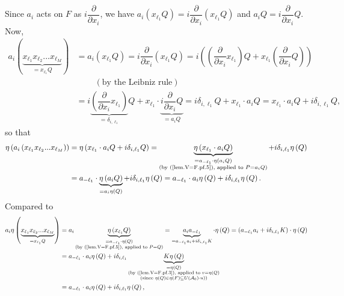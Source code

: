 \documentclass
[numbers=enddot,12pt,final,onecolumn,german,notitlepage]{scrartcl}%
\theoremstyle{definition}
\begin{document}
Since $a_{i}$ acts on $F$ as $i\dfrac{\partial}{\partial x_{i}}$, we have
$a_{i}\left(  x_{\ell_{1}}Q\right)  =i\dfrac{\partial}{\partial x_{i}}\left(
x_{\ell_{1}}Q\right)  $ and $a_{i}Q=i\dfrac{\partial}{\partial x_{i}}Q$. Now,%
\begin{align*}
a_{i}\left(  \underbrace{x_{\ell_{1}}x_{\ell_{2}}...x_{\ell_{M}}}%
_{=x_{\ell_{1}}Q}\right)   &  =a_{i}\left(  x_{\ell_{1}}Q\right)
=i\dfrac{\partial}{\partial x_{i}}\left(  x_{\ell_{1}}Q\right)  =i\left(
\left(  \dfrac{\partial}{\partial x_{i}}x_{\ell_{1}}\right)  Q+x_{\ell_{1}%
}\left(  \dfrac{\partial}{\partial x_{i}}Q\right)  \right) \\
&  \ \ \ \ \ \ \ \ \ \ \left(  \text{by the Leibniz rule}\right) \\
&  =i\underbrace{\left(  \dfrac{\partial}{\partial x_{i}}x_{\ell_{1}}\right)
}_{=\delta_{i,\ell_{1}}}Q+x_{\ell_{1}}\cdot\underbrace{i\dfrac{\partial
}{\partial x_{i}}Q}_{=a_{i}Q}=i\delta_{i,\ell_{1}}Q+x_{\ell_{1}}\cdot
a_{i}Q=x_{\ell_{1}}\cdot a_{i}Q+i\delta_{i,\ell_{1}}Q,
\end{align*}
so that%
\begin{align*}
\eta\left(  a_{i}\left(  x_{\ell_{1}}x_{\ell_{2}}...x_{\ell_{M}}\right)
\right)   &  =\eta\left(  x_{\ell_{1}}\cdot a_{i}Q+i\delta_{i,\ell_{1}%
}Q\right)  =\underbrace{\eta\left(  x_{\ell_{1}}\cdot a_{i}Q\right)
}_{\substack{=a_{-\ell_{1}}\cdot\eta\left(  a_{i}Q\right)  \\\text{(by
(\ref{lem.V=F.pf.5}), applied to }P=a_{i}Q\text{)}}}+i\delta_{i,\ell_{1}}%
\eta\left(  Q\right) \\
&  =a_{-\ell_{1}}\cdot\underbrace{\eta\left(  a_{i}Q\right)  }_{=a_{i}%
\eta\left(  Q\right)  }+i\delta_{i,\ell_{1}}\eta\left(  Q\right)
=a_{-\ell_{1}}\cdot a_{i}\eta\left(  Q\right)  +i\delta_{i,\ell_{1}}%
\eta\left(  Q\right)  .
\end{align*}
Compared to%
\begin{align*}
a_{i}\eta\left(  \underbrace{x_{\ell_{1}}x_{\ell_{2}}...x_{\ell_{M}}%
}_{=x_{\ell_{1}}Q}\right)   &  =a_{i}\underbrace{\eta\left(  x_{\ell_{1}%
}Q\right)  }_{\substack{=a_{-\ell_{1}}\cdot\eta\left(  Q\right)  \\\text{(by
(\ref{lem.V=F.pf.5}), applied to }P=Q\text{)}}}=\underbrace{a_{i}a_{-\ell_{1}%
}}_{=a_{-\ell_{1}}a_{i}+i\delta_{i,\ell_{1}}K}\cdot\eta\left(  Q\right)
=\left(  a_{-\ell_{1}}a_{i}+i\delta_{i,\ell_{1}}K\right)  \cdot\eta\left(
Q\right) \\
&  =a_{-\ell_{1}}\cdot a_{i}\eta\left(  Q\right)  +i\delta_{i,\ell_{1}%
}\underbrace{K\eta\left(  Q\right)  }_{\substack{=\eta\left(  Q\right)
\\\text{(by (\ref{lem.V=F.pf.3}), applied to }v=\eta\left(  Q\right)
\\\text{(since }\eta\left(  Q\right)  \in\eta\left(  F\right)  \subseteq
U\left(  \mathcal{A}_{0}\right)  \cdot u\text{))}}}\\
&  =a_{-\ell_{1}}\cdot a_{i}\eta\left(  Q\right)  +i\delta_{i,\ell_{1}}%
\eta\left(  Q\right)  ,
\end{align*}
\end{document}

